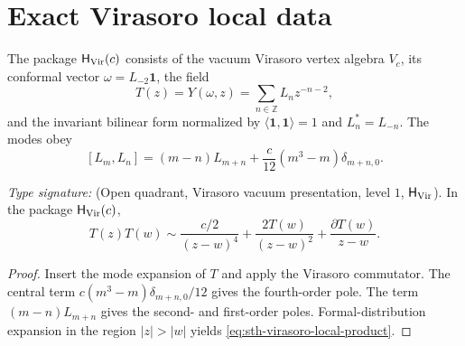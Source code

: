 \section{Exact Virasoro local data}
\label{sec:sth-setup}

\begin{definition}
\ClaimStatusDefinitional
\label{def:sth-virasoro-vacuum-package}
The package $\mathsf H_{\mathrm{Vir}}(c)$ consists of the vacuum Virasoro
vertex algebra $V_c$, its conformal vector
$\omega=L_{-2}\mathbf1$, the field
\[
  T(z)=Y(\omega,z)=\sum_{n\in\mathbb Z}L_nz^{-n-2},
\]
and the invariant bilinear form normalized by
$\langle\mathbf1,\mathbf1\rangle=1$ and
$L_n^\ast=L_{-n}$.  The modes obey
\[
 [L_m,L_n]=(m-n)L_{m+n}
 +\frac{c}{12}(m^3-m)\delta_{m+n,0}.
\]
\end{definition}

\begin{theorem}
\ClaimStatusProvedHere
\label{thm:sth-virasoro-local-product}
\emph{Type signature:}
\textup{(Open quadrant, Virasoro vacuum presentation, level \(1\),
\(\mathsf H_{\mathrm{Vir}}\)).}
In the package $\mathsf H_{\mathrm{Vir}}(c)$,
\begin{equation}
 T(z)T(w)\sim
 \frac{c/2}{(z-w)^4}
 +\frac{2T(w)}{(z-w)^2}
 +\frac{\partial T(w)}{z-w}.
 \label{eq:sth-virasoro-local-product}
\end{equation}
\end{theorem}

\begin{proof}
Insert the mode expansion of $T$ and apply the Virasoro commutator.
The central term
$c(m^3-m)\delta_{m+n,0}/12$ gives the fourth-order pole.
The term $(m-n)L_{m+n}$ gives the second- and first-order poles.
Formal-distribution expansion in the region $|z|>|w|$ yields
\eqref{eq:sth-virasoro-local-product}.
\end{proof}


